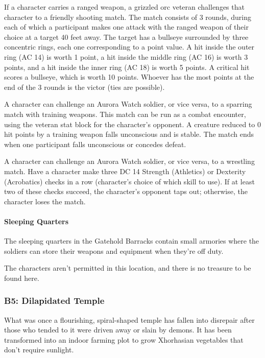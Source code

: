\documentclass[10pt,a4paper,twoside,bg=print,twocolumn,openany,nodeprecatedcode]{dndbook}
\begin{document}
\begin{description}[nolistsep]
\item[Shooting Match.]
If a character carries a ranged weapon, a grizzled orc veteran challenges that character to a friendly shooting match. The match consists of 3 rounds, during each of which a participant makes one attack with the ranged weapon of their choice at a target 40 feet away. The target has a bullseye surrounded by three concentric rings, each one corresponding to a point value. A hit inside the outer ring (AC 14) is worth 1 point, a hit inside the middle ring (AC 16) is worth 3 points, and a hit inside the inner ring (AC 18) is worth 5 points. A critical hit scores a bullseye, which is worth 10 points. Whoever has the most points at the end of the 3 rounds is the victor (ties are possible).
\item[Sparring Match.]
A character can challenge an Aurora Watch soldier, or vice versa, to a sparring match with training weapons. This match can be run as a combat encounter, using the veteran stat block for the character's opponent. A creature reduced to 0 hit points by a training weapon falls unconscious and is stable. The match ends when one participant falls unconscious or concedes defeat.
\item[Wrestling Match.]
A character can challenge an Aurora Watch soldier, or vice versa, to a wrestling match. Have a character make three DC 14 Strength (Athletics) or Dexterity (Acrobatics) checks in a row (character's choice of which skill to use). If at least two of these checks succeed, the character's opponent taps out; otherwise, the character loses the match.
\end{description}

\paragraph{Sleeping Quarters}
The sleeping quarters in the Gatehold Barracks contain small armories where the soldiers can store their weapons and equipment when they're off duty.

The characters aren't permitted in this location, and there is no treasure to be found here.

\subsubsection{B5: Dilapidated Temple}
What was once a flourishing, spiral-shaped temple has fallen into disrepair after those who tended to it were driven away or slain by demons. It has been transformed into an indoor farming plot to grow Xhorhasian vegetables that don't require sunlight.
\end{document}
